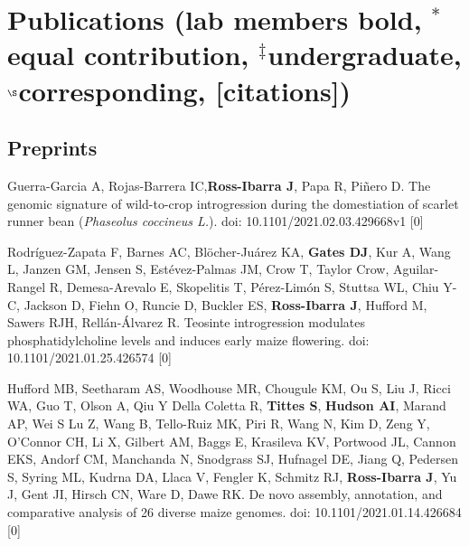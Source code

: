\documentclass[letterpaper,10pt]{article}
\renewenvironment{itemize}{
  \begin{list}{}{
    \setlength{\leftmargin}{1.5em}
  }
}{
  \end{list}
}
\begin{document}
\section*{Publications {\small(lab members bold, $^*$equal contribution, $^\ddagger$undergraduate, $^\S$corresponding, [citations])}}


\subsection*{Preprints}
\begin{itemize}



\item Guerra-Garcia A, Rojas-Barrera IC,\textbf{Ross-Ibarra J}, Papa R, Piñero D. The genomic signature of wild-to-crop introgression during the domestiation of scarlet runner bean (\textit{Phaseolus coccineus L.}). doi: 10.1101/2021.02.03.429668v1
 [0]\\

\item Rodr\'iguez-Zapata F, Barnes AC, Bl\"{o}cher-Ju\'arez KA, \textbf{Gates DJ}, Kur A,  Wang L, Janzen GM,  Jensen S, Est\'evez-Palmas JM, Crow T, Taylor Crow, Aguilar-Rangel R, Demesa-Arevalo E, Skopelitis T, P\'erez-Lim\'on S, Stuttsa WL, Chiu Y-C, Jackson D, Fiehn O, Runcie D, Buckler ES, \textbf{Ross-Ibarra J}, Hufford M, Sawers RJH, Rell\'an-\'Alvarez R. Teosinte introgression modulates phosphatidylcholine levels and induces early maize flowering. doi: 10.1101/2021.01.25.426574
 [0]\\

\item Hufford MB, Seetharam AS, Woodhouse MR, Chougule KM, Ou S, Liu J, Ricci WA, Guo T, Olson A, Qiu Y Della Coletta R, \textbf{Tittes S}, \textbf{Hudson AI},  Marand AP, Wei S Lu Z, Wang B, Tello-Ruiz MK, Piri R, Wang N, Kim D, Zeng Y, O'Connor CH, Li X, Gilbert AM, Baggs E, Krasileva KV, Portwood JL, Cannon EKS, Andorf CM, Manchanda N, Snodgrass SJ, Hufnagel DE, Jiang Q, Pedersen S, Syring ML, Kudrna DA, Llaca V, Fengler K, Schmitz RJ, \textbf{Ross-Ibarra J}, Yu J, Gent JI, Hirsch CN, Ware D, Dawe RK. De novo assembly, annotation, and comparative analysis of 26 diverse maize genomes. doi: 10.1101/2021.01.14.426684
 [0]\\


\end{itemize}
\end{document}
